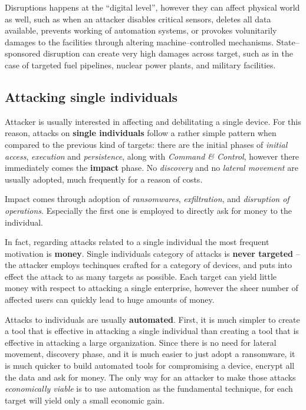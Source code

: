 \documentclass[10pt]{extbook}
\begin{document}
Disruptions happens at the ``digital level'', however they can affect physical
world as well, such as when an attacker disables critical sensors, deletes all
data available, prevents working of automation systems, or provokes
volunitarily damages to the facilities through altering machine--controlled
mechanisms. State--sponsored disruption can create very high damages across
target, such as in the case of targeted fuel pipelines, nuclear power plants,
and military facilities.


\subsection{Attacking single individuals}

Attacker is usually interested in affecting and debilitating a single device.
For this reason, attacks on \textbf{single individuals} follow a rather simple
pattern when compared to the previous kind of targets: there are the initial
phases of \emph{initial access}, \emph{execution} and \emph{persistence}, along
with \emph{Command \& Control}, however there immediately comes the
\textbf{impact} phase. No \emph{discovery} and no \emph{lateral movement} are
usually adopted, much frequently for a reason of costs.

Impact comes through adoption of \emph{ransomwares}, \emph{exfiltration}, and
\emph{disruption of operations}. Especially the first one is employed to
directly ask for money to the individual.

In fact, regarding attacks related to a single individual the most frequent
motivation is \textbf{money}. Single individuals category of attacks is
\textbf{never targeted} -- the attacker employs techinques crafted for a category
of devices, and puts into effect the attack to as many targets as possible.
Each target can yield little money with respect to attacking a single
enterprise, however the sheer number of affected users can quickly lead to huge
amounts of money.

Attacks to individuals are usually \textbf{automated}. First, it is much
simpler to create a tool that is effective in attacking a single individual
than creating a tool that is effective in attacking a large organization. Since
there is no need for lateral movement, discovery phase, and it is much easier
to just adopt a ransomware, it is much quicker to build automated tools for
compromising a device, encrypt all the data and ask for money. The only way for
an attacker to make those attacks \emph{economically viable} is to use
automation as the fundamental technique, for each target will yield only a small
economic gain.
\end{document}
